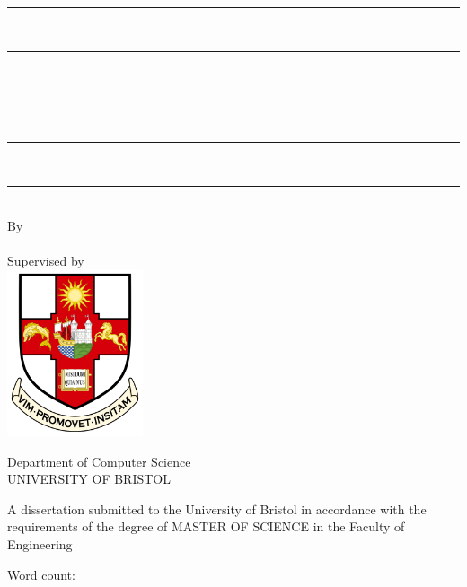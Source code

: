 \begin{titlepage}
    \centering
    
    \rule{\textwidth}{2pt} \\[-0.4ex] 
    \rule{\textwidth}{0.5pt} \\[1cm] 
    
    {\LARGE\bfseries \myReportTitle} \\[0.5cm]
    
    \parbox{0.89\textwidth}{\centering
    {\large \myReportSubtitle}
    } \\[0.5cm]
    
    \rule{\textwidth}{0.5pt} \\[-0.4ex] 
    \rule{\textwidth}{2pt} \\[1cm]   
    
    {\large By} \\[0.5cm]
    {\large \myName} \\[1cm]
    {\large Supervised by \mySupervisor} \\[1.5cm]
    
    \includegraphics[width=0.3\textwidth]{contents/0-preamble/fig00/uob_logo.png} \\[1.5cm]
    
    \begin{minipage}{0.6\textwidth} %
        \centering
        {\Large Department of Computer Science} \\[0.5cm]
        {\Large UNIVERSITY OF BRISTOL} \\[1cm]
        \begin{flushleft}
        {\normalsize A dissertation submitted to the University of Bristol in accordance with the requirements of the degree of MASTER OF SCIENCE in the Faculty of Engineering} \\[1cm]
        \end{flushleft}
        {\large \mySubmissionMonthYear}
    \end{minipage}
    \vfill

    \vspace{1cm}
    \begin{flushright}
        Word count: \wordCount
    \end{flushright}

\end{titlepage}